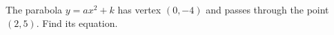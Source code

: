 The parabola $y=ax^2+k$ has vertex $(0,-4)$ and passes through the point $(2,5)$. Find its equation.
